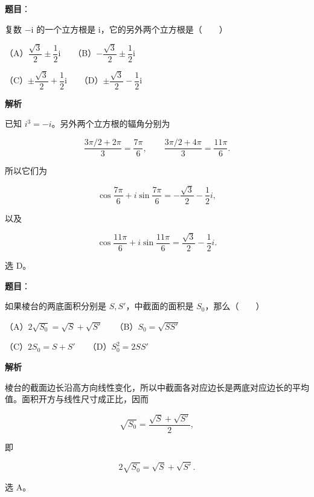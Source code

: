 \begin{answer}

\textbf{题目}：

复数 $-\mathrm{i}$ 的一个立方根是 $\mathrm{i}$，它的另外两个立方根是\mbox{（　　）}

（A）$\dfrac{\sqrt3}{2}\pm\dfrac12\mathrm{i}$　　（B）$-\dfrac{\sqrt3}{2}\pm\dfrac12\mathrm{i}$

（C）$\pm\dfrac{\sqrt3}{2}+\dfrac12\mathrm{i}$　　（D）$\pm\dfrac{\sqrt3}{2}-\dfrac12\mathrm{i}$

\textbf{解析}

已知 $i^3=-i$。另外两个立方根的辐角分别为

\nopagebreak[4]
\[
\frac{3\pi/2+2\pi}{3}=\frac{7\pi}6,
\qquad
\frac{3\pi/2+4\pi}{3}=\frac{11\pi}6.
\]

所以它们为

\nopagebreak[4]
\[
\cos\frac{7\pi}6+i\sin\frac{7\pi}6
=-\frac{\sqrt3}{2}-\frac12i,
\]

以及

\nopagebreak[4]
\[
\cos\frac{11\pi}6+i\sin\frac{11\pi}6
=\frac{\sqrt3}{2}-\frac12i.
\]

选 D。


\end{answer}
\begin{answer}

\textbf{题目}：

如果棱台的两底面积分别是 $S,S'$，中截面的面积是 $S_0$，那么\mbox{（　　）}

（A）$2\sqrt{S_0}=\sqrt S+\sqrt{S'}$　　（B）$S_0=\sqrt{SS'}$

（C）$2S_0=S+S'$　　（D）$S_0^2=2SS'$

\textbf{解析}

棱台的截面边长沿高方向线性变化，所以中截面各对应边长是两底对应边长的平均值。面积开方与线性尺寸成正比，因而

\nopagebreak[4]
\[
\sqrt{S_0}=\frac{\sqrt S+\sqrt{S'}}2,
\]

即

\nopagebreak[4]
\[
2\sqrt{S_0}=\sqrt S+\sqrt{S'}.
\]

选 A。


\end{answer}
